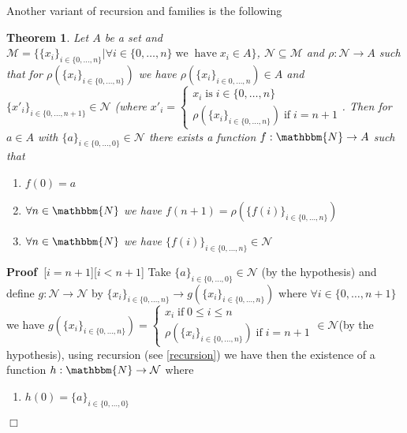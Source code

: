 \documentclass{book}
\newcommand{\tmop}[1]{\ensuremath{\operatorname{#1}}}
\newenvironment{proof}{\noindent\textbf{Proof\ }}{\hspace*{\fill}$\Box$\medskip}
\newtheorem{theorem}{Theorem}
\begin{document}
{{Another variant of recursion and families is the following

\begin{theorem}
  \label{recursion on restricted sequences}Let $A$ be a set and $\mathcal{M}=
  \{ \{ x_i \}_{i \in \{ 0, \ldots, n \}} | \forall i \in \{ 0, \ldots, n \}
  \tmop{we} \tmop{have} x_i \in A \}$, $\mathcal{N} \subseteq \mathcal{M}$ and
  $\rho : \mathcal{N} \rightarrow A$ such that for $\rho (\{ x_i \}_{i \in \{
  0, \ldots, n \}})$ we have $\rho (\{ x_i \}_{i \in 0, \ldots, n}) \in A$ and
  $\{ x'_i \}_{i \in \{ 0, \ldots, n + 1 \}} \in \mathcal{N}$ (where $x'_i =
  \left\{ \begin{array}{l}
    x_i \tmop{is} i \in \{ 0, \ldots, n \}\\
    \rho (\{ x_i \}_{i \in \{ 0, \ldots, n \}}) \tmop{if} i = n + 1
  \end{array} \right.$. Then for $a \in A$ with $\{ a \}_{i \in \{ 0, \ldots,
  0 \}} \in \mathcal{N}$ there exists a function $f : \mathbbm{N} \rightarrow
  A$ such that
  \begin{enumerate}
    \item $f (0) = a$
    
    \item $\forall n \in \mathbbm{N}$ we have $f (n + 1) = \rho (\{ f (i)
    \}_{i \in \{ 0, \ldots, n \}})$
    
    \item $\forall n \in \mathbbm{N}$ we have $\{ f (i) \}_{i \in \{ 0,
    \ldots, n \}} \in \mathcal{N}$
  \end{enumerate}
\end{theorem}

\begin{proof}[$i = n + 1$][$i < n + 1$]
  Take $\{ a \}_{i \in \{ 0, \ldots, 0 \}} \in \mathcal{N}$ (by the
  hypothesis) and define $g : \mathcal{N} \rightarrow \mathcal{N}$ by $\{ x_i
  \}_{i \in \{ 0, \ldots, n \}} \rightarrow g (\{ x_i \}_{i \in \{ 0, \ldots,
  n \}})$ where $\forall i \in \{ 0, \ldots, n + 1 \}$ we have $g (\{ x_i
  \}_{i \in \{ 0, \ldots, n \}}) = \left\{ \begin{array}{l}
    x_i \tmop{if} 0 \leqslant i \leqslant n\\
    \rho (\{ x_i \}_{i \in \{ 0, \ldots, n \}}) \tmop{if} i = n + 1
  \end{array} \right. \in \mathcal{N}$(by the hypothesis), using recursion
  (see \ref{recursion}) we have then the existence of a function $h :
  \mathbbm{N} \rightarrow \mathcal{N}$ where
  \begin{enumerate}
    \item $h (0) = \{ a \}_{i \in \{ 0, \ldots, 0 \}}$
    

\end{enumerate}
\end{proof}}}
\end{document}

